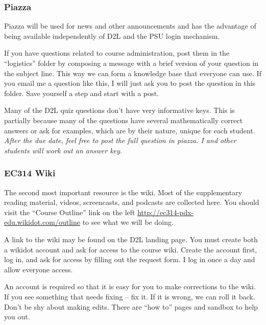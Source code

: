 \documentclass[letterpaper,10pt]{article}
\begin{document}
  

\subsubsection{Piazza}
Piazza will be used for news and other announcements and has the advantage of being available independently of D2L and the PSU login mechanism.  

If you have questions related to course administration, post them in
the ``logistics'' folder by composing a message with a brief version of your question in the subject line. This way we can form a knowledge base that everyone can use.  If you email me a question like this, I will just ask you to post the question in this folder.  Save yourself a step and start with a post.

Many of the D2L quiz questions don't have very informative keys. This is partially because many of the questions have several mathematically correct answers or ask for examples, which are by their nature, unique for each student. \emph{After the due date, feel free to post the full question in piazza.  I and other students will work out an answer key.}


\subsubsection{EC314 Wiki}
The second most important resource is the wiki.  Most of the
supplementary reading material, videos, screencasts, and podcasts are
collected here. You should visit the ``Course Outline'' link on the
left \url{http://ec314-pdx-edu.wikidot.com/outline} to see what we will be
doing.

A link to the wiki may be found on the D2L landing page.  You must create both a wikidot account and ask for access to the course wiki.  Create the account first, log in, and ask for access by filling out the request form.  I log in once a day and allow everyone access.  

An account is required so that it is easy for you to make corrections to the wiki.  If you see something that needs fixing -- fix it.  If it is wrong, we can roll it back.  Don't be shy about making edits.  There are ``how to'' pages and sandbox to help you out.
\end{document}
